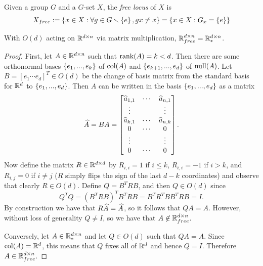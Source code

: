 \begin{definition}
    Given a group $G$ and a $G$-set $X$, the \emph{free locus} of $X$ is
    \[
        X_{free}
        :=
        \set{x \in X : \forall g \in G \sminus \set{e}, g x \neq x}
        =
        \set{x \in X : G_x = \set{e}}
    \]
\end{definition}

\begin{lemma}\label{lem:free-iff-full-rank}
    With $O(d)$ acting on $\R^{d \times n}$ via matrix multiplication, $\R^{d \times n}_{free} = \R^{d \times n}_*$.
    \begin{proof}
        First, let $A \in \R^{d \times n}$ such that $\rank(A) = k < d$.
        Then there are some orthonormal bases $\set{e_1,...,e_k}$ of $\col(A)$ and $\set{e_{k+1},...,e_d}$ of $\nul(A)$.
        Let $B = [e_1 \cdots e_d]^T \in O(d)$ be the change of basis matrix from the standard basis for $\R^d$ to $\set{e_1,...,e_d}$.
        Then $A$ can be written in the basis $\set{e_1,...,e_d}$ as a matrix
        \[
            \Hat{A} = 
            BA = 
            \begin{bmatrix}
                \Hat{a}_{1,1} & \cdots & \Hat{a}_{n,1} \\
                \vdots & & \vdots \\
                \Hat{a}_{k,1} & \cdots & \Hat{a}_{n,k} \\
                0 & \cdots & 0 \\
                \vdots & & \vdots \\
                0 & \cdots & 0
            \end{bmatrix}.
        \]
    Now define the matrix $R \in \R^{d \times d}$ by $R_{i,i} = 1$ if $i \leq k$, $R_{i,i} = -1$ if $i > k$, and $R_{i,j} = 0$ if $i \neq j$ ($R$ simply flips the sign of the last $d-k$ coordinates) and observe that clearly $R \in O(d)$.
    Define $Q = B^T R B$, and then $Q \in O(d)$ since
    \[
        Q^T Q
        = (B^T R B)^T B^T R B
        = B^T R^T B B^T R B
        = I.
    \]
    By construction we have that $R\Hat{A} = \Hat{A}$, so it follows that $QA = A$.
    However, without loss of generality $Q \neq I$, so we have that $A \not\in \R^{d \times n}_{free}$.
    
    Conversely, let $A \in \R^{d \times n}_*$ and let $Q \in O(d)$ such that $QA = A$.
    Since $\col(A) = \R^d$, this means that $Q$ fixes all of $\R^d$ and hence $Q = I$.
    Therefore $A \in \R^{d \times n}_{free}$.
    \end{proof}
\end{lemma}

